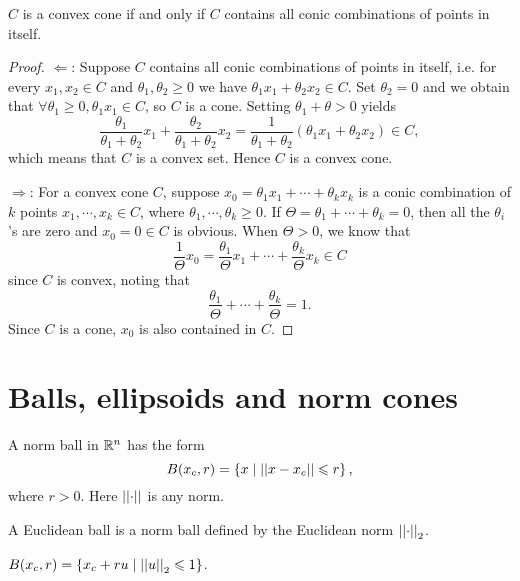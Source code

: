 \documentclass[12pt]{article}
\begin{document}
\begin{proposition}
    \(C\) is a convex cone if and only if \(C\) contains all conic combinations of points in itself.
\end{proposition}
\begin{proof}
    \(\Leftarrow\): Suppose \(C\) contains all conic combinations of points in itself, i.e. for every \(x_1,x_2\in C\) and \(\theta_1,\theta_2\geqslant 0\) we have \(\theta_1x_1+\theta_2x_2\in C\). Set \(\theta_2=0\) and we obtain that \(\forall\theta_1\geqslant 0,\theta_1x_1\in C\), so \(C\) is a cone. Setting \(\theta_1+\theta>0\) yields
    \[\frac{\theta_1}{\theta_1+\theta_2}x_1+\frac{\theta_2}{\theta_1+\theta_2}x_2=\frac{1}{\theta_1+\theta_2}\left(\theta_1x_1+\theta_2x_2\right)\in C,\]
    which means that \(C\) is a convex set. Hence \(C\) is a convex cone.\par
    \(\Rightarrow\): For a convex cone \(C\), suppose \(x_0=\theta_1x_1+\cdots+\theta_kx_k\) is a conic combination of \(k\) points \(x_1,\cdots,x_k\in C\), where \(\theta_1,\cdots,\theta_k\geqslant 0\). If \(\Theta=\theta_1+\cdots+\theta_k=0\), then all the \(\theta_i\)'s are zero and \(x_0=0\in C\) is obvious. When \(\Theta>0\), we know that
    \[\frac{1}{\Theta}x_0=\frac{\theta_1}{\Theta}x_1+\cdots+\frac{\theta_k}{\Theta}x_k\in C\]
    since \(C\) is convex, noting that
    \[\frac{\theta_1}{\Theta}+\cdots+\frac{\theta_k}{\Theta}=1.\]
    Since \(C\) is a cone, \(x_0\) is also contained in \(C\).
\end{proof}

\section{Balls, ellipsoids and norm cones}

\begin{definition}
    A \textnormal{norm ball} in \(\mathbb R^n\) has the form
    \[B(x_c,r)=\left\{x\mid\left|\left|x-x_c\right|\right|\leqslant r\right\},\]
    where \(r>0\). Here \(\left|\left|\cdot\right|\right|\) is any norm.
\end{definition}

\begin{definition}
    A \textnormal{Euclidean ball} is a norm ball defined by the Euclidean norm \(\left|\left|\cdot\right|\right|_2\).
\end{definition}

\begin{remark}
    \(B(x_c,r)=\left\{x_c+ru\mid \left|\left|u\right|\right|_2\leqslant 1\right\}\).
\end{remark}
\end{document}
